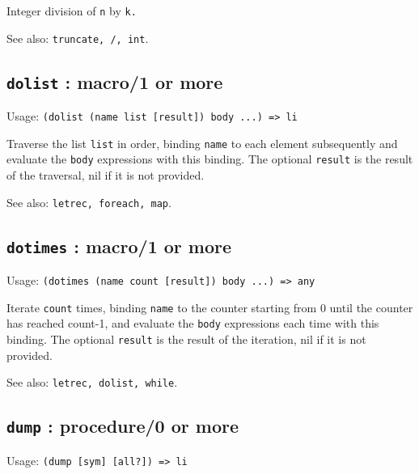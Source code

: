 \documentclass[
]{article}
\newcommand{\passthrough}[1]{#1}
\begin{document}
Integer division of \passthrough{\lstinline!n!} by
\passthrough{\lstinline!k.!}

See also: \passthrough{\lstinline!truncate, /, int!}.

\hypertarget{dolist-macro1-or-more-1}{%
\subsection{\texorpdfstring{\texttt{dolist} : macro/1 or
more}{dolist : macro/1 or more}}\label{dolist-macro1-or-more-1}}

Usage:
\passthrough{\lstinline!(dolist (name list [result]) body ...) => li!}

Traverse the list \passthrough{\lstinline!list!} in order, binding
\passthrough{\lstinline!name!} to each element subsequently and evaluate
the \passthrough{\lstinline!body!} expressions with this binding. The
optional \passthrough{\lstinline!result!} is the result of the
traversal, nil if it is not provided.

See also: \passthrough{\lstinline!letrec, foreach, map!}.

\hypertarget{dotimes-macro1-or-more-1}{%
\subsection{\texorpdfstring{\texttt{dotimes} : macro/1 or
more}{dotimes : macro/1 or more}}\label{dotimes-macro1-or-more-1}}

Usage:
\passthrough{\lstinline!(dotimes (name count [result]) body ...) => any!}

Iterate \passthrough{\lstinline!count!} times, binding
\passthrough{\lstinline!name!} to the counter starting from 0 until the
counter has reached count-1, and evaluate the
\passthrough{\lstinline!body!} expressions each time with this binding.
The optional \passthrough{\lstinline!result!} is the result of the
iteration, nil if it is not provided.

See also: \passthrough{\lstinline!letrec, dolist, while!}.

\hypertarget{dump-procedure0-or-more-1}{%
\subsection{\texorpdfstring{\texttt{dump} : procedure/0 or
more}{dump : procedure/0 or more}}\label{dump-procedure0-or-more-1}}

Usage: \passthrough{\lstinline!(dump [sym] [all?]) => li!}
\end{document}
